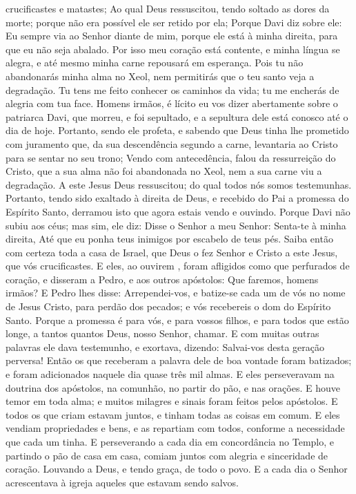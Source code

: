 {{} crucificastes e matastes;
Ao qual Deus ressuscitou, tendo soltado as dores da morte; porque não era possível ele ser retido por ela;
Porque Davi diz sobre ele: Eu sempre via ao Senhor diante de mim, porque ele está à minha direita, para que eu não seja abalado.
Por isso meu coração está contente, e minha língua se alegra, e até mesmo minha carne repousará em esperança.
Pois tu não abandonarás minha alma no Xeol,
 nem permitirás que o teu santo veja a degradação.
Tu tens me feito conhecer os caminhos da vida; tu me encherás de alegria com tua face.
Homens irmãos, é lícito eu vos dizer abertamente sobre o patriarca Davi, que morreu, e foi sepultado, e a sepultura dele está conosco até o dia de hoje.
Portanto, sendo ele profeta, e sabendo que Deus tinha lhe prometido com juramento que, da sua descendência
 segundo a carne, levantaria ao Cristo para se sentar no seu trono;
Vendo
{} com antecedência, falou da ressurreição do Cristo, que a sua alma não foi abandonada no Xeol, nem a sua carne viu a degradação.
A este Jesus Deus ressuscitou; do qual todos nós somos testemunhas.
Portanto, tendo sido exaltado à direita de Deus, e recebido do Pai a promessa do Espírito Santo, derramou isto que agora estais vendo e ouvindo.
Porque Davi não subiu aos céus; mas sim, ele diz: Disse o Senhor a meu Senhor: Senta-te à minha direita,
Até que eu ponha teus inimigos por escabelo de teus pés.
Saiba então com certeza toda a casa de Israel, que Deus o fez Senhor e Cristo a este Jesus, que vós crucificastes.
E eles, ao ouvirem
{} , foram afligidos como que perfurados de coração, e disseram a Pedro, e aos outros apóstolos: Que faremos, homens irmãos?
E Pedro lhes disse: Arrependei-vos, e batize-se cada um de vós no nome de Jesus Cristo, para perdão dos pecados; e vós recebereis o dom do Espírito Santo.
Porque a promessa é para vós, e para vossos filhos, e para todos que
{} estão longe, a tantos quantos Deus, nosso Senhor, chamar.
E com muitas outras palavras ele dava testemunho, e exortava, dizendo: Salvai-vos desta geração perversa!
Então os que receberam a palavra dele de boa vontade foram batizados; e foram adicionados naquele dia quase três mil almas.
E eles perseveravam na doutrina dos apóstolos, na comunhão, no partir do pão, e nas orações.
E houve temor em toda alma; e muitos milagres e sinais foram feitos pelos apóstolos.
E todos os que criam estavam juntos, e tinham todas as coisas em comum.
E eles vendiam
{} propriedades e bens, e as repartiam com todos, conforme a necessidade que cada um tinha.
E perseverando a cada dia em concordância no Templo, e partindo o pão de casa em casa, comiam juntos com alegria e sinceridade de coração.
Louvando a Deus, e tendo graça,
{} de todo o povo. E a cada dia o Senhor acrescentava à igreja aqueles que estavam sendo salvos.

}
